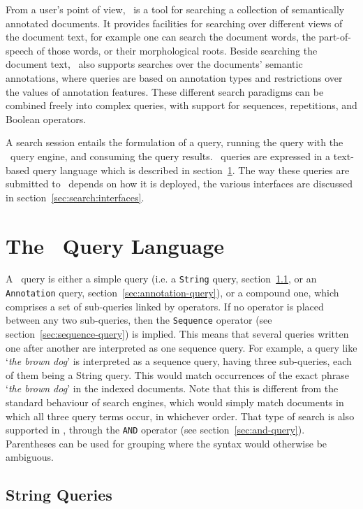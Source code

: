 From a user's point of view, \Mimir\ is a tool for searching a collection of
semantically annotated documents.  It provides facilities for searching over
different views of the document text, for example one can search the document
words, the part-of-speech of those words, or their morphological roots. Beside
searching the document text, \Mimir\ also supports searches over the documents'
semantic annotations, where queries are based on annotation types and
restrictions over the values of annotation features. These different search
paradigms can be combined freely into complex queries, with support for
sequences, repetitions, and Boolean operators.

A search session entails the formulation of a query, running the query with the
\Mimir\ query engine, and consuming the query results.  \Mimir\ queries are
expressed in a text-based query language which is described in
section~\ref{sec:search:ql}.  The way these queries are submitted to \Mimir\
depends on how it is deployed, the various interfaces are discussed in
section~\ref{sec:search:interfaces}.


\section{The \Mimir\ Query Language}\label{sec:search:ql}

A \Mimir\ query is either a simple query (i.e. a {\tt String} query,
section~\ref{sec:string-query}, or an {\tt Annotation} query,
section~\ref{sec:annotation-query}), or a compound one, which comprises a set of
sub-queries linked by operators. If no operator is placed between any two
sub-queries, then the {\tt Sequence} operator (see
section~\ref{sec:sequence-query}) is implied. This means that several queries
written one after another are interpreted as one sequence query. For example, a
query like `{\it the brown dog}' is interpreted as a sequence query, having
three sub-queries, each of them being a String query. This would match
occurrences of the exact phrase `{\it the brown dog}' in the indexed documents.
Note that this is different from the standard behaviour of search engines,
which would simply match documents in which all three query terms occur, in
whichever order. That type of search is also supported in \Mimir, through the
{\tt AND} operator (see section~\ref{sec:and-query}).  Parentheses can be used
for grouping where the syntax would otherwise be ambiguous.

\subsection{String Queries}\label{sec:string-query}

